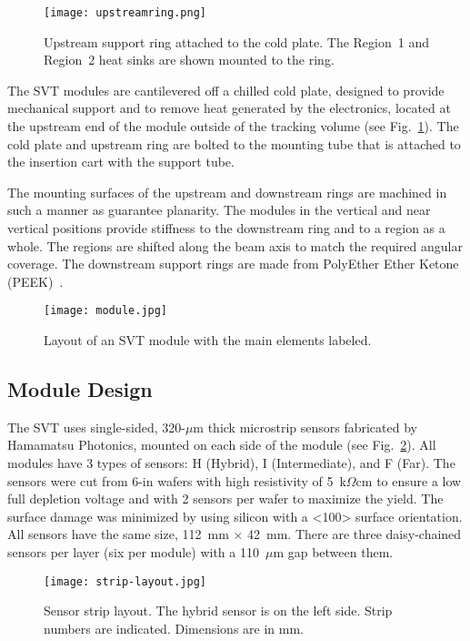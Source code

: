 \begin{figure}[h] 
\centering 
\texttt{[image: upstreamring.png]}
\caption{Upstream support ring attached to the cold plate. The Region~1 and Region~2 heat sinks are shown
  mounted to the ring.}
\label{fig:upstreamring}
\end{figure}

The SVT modules are cantilevered off a chilled cold plate, designed to provide mechanical support and to remove
heat generated by the electronics, located at the upstream end of the module outside of the tracking volume (see
Fig.~\ref{fig:upstreamring}). The cold plate and upstream ring are bolted to the mounting tube that is attached to
the insertion cart with the support tube. 
 
The mounting surfaces of the upstream and downstream rings are machined in such a manner as guarantee planarity.
The modules in the vertical and near vertical positions provide stiffness to the downstream ring and to a region as a
whole. The regions are shifted along the beam axis to match the required angular coverage. The downstream support
rings are made from PolyEther Ether Ketone (PEEK)~\cite{NIMVCC}. 

\begin{figure}[h] 
\centering 
\texttt{[image: module.jpg]}
\caption{Layout of an SVT module with the main elements labeled.}
\label{fig:module}
\end{figure}

\subsection{Module Design}

The SVT uses single-sided, 320-$\mu$m thick microstrip sensors fabricated by Hamamatsu Photonics, mounted on
each side of the module (see Fig.~\ref{fig:module}). All modules have 3 types of sensors: H (Hybrid), I
(Intermediate), and F (Far). The sensors were cut from 6-in wafers with high resistivity of 5~k$\Omega$cm to
ensure a low full depletion voltage and with 2 sensors per wafer to maximize the yield. The surface damage was
minimized by using silicon with a <100> surface orientation. All sensors have the same size, 112~mm $\times$ 42~mm.
There are three daisy-chained sensors per layer (six per module) with a 110~$\mu$m gap between them. 

\begin{figure}[h] 
\centering 
\texttt{[image: strip-layout.jpg]}
\caption{Sensor strip layout. The hybrid sensor is on the left side. Strip numbers are indicated. Dimensions are in mm.}
\label{fig:strip-layout}
\end{figure}

